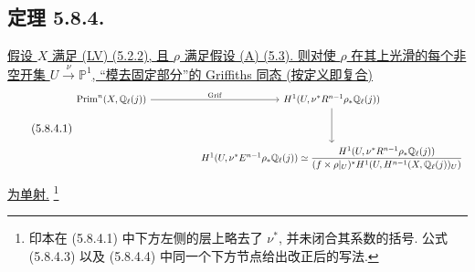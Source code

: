 \subsection*{定理 5.8.4.}
\underline{假设 $X$ 满足 (LV) (5.2.2), 且 $\rho$ 满足假设 (A) (5.3). 则对使 $\rho$ 在其上光滑的每个非空开集 $U\xrightarrow{\nu}\mathbb P^1$, “模去固定部分”的 Griffiths 同态 (按定义即复合)}
\begin{equation}\tag{5.8.4.1}
\resizebox{\textwidth}{!}{%
\begin{tikzcd}[ampersand replacement=\&,row sep=huge,column sep=huge]
\operatorname{Prim}^n(X,\mathbb Q_\ell(j))
  \arrow[r,"\operatorname{Grif}"]
\&
H^1(U,\nu^*R^{n-1}\rho_*\mathbb Q_\ell(j))
  \arrow[d]
\\
{}
\&
H^1(U,\nu^*E^{n-1}\rho_*\mathbb Q_\ell(j))
\simeq
\dfrac{H^1(U,\nu^*R^{n-1}\rho_*\mathbb Q_\ell(j))}
{(f\times\rho|_U)^*
 H^1(U,H^{n-1}(X,\mathbb Q_\ell(j))_U)}
\end{tikzcd}}
\end{equation}
\underline{为单射.}
\footnote{印本在 (5.8.4.1) 中下方左侧的层上略去了 $\nu^*$, 并未闭合其系数的括号. 公式 (5.8.4.3) 以及 (5.8.4.4) 中同一个下方节点给出改正后的写法.}

